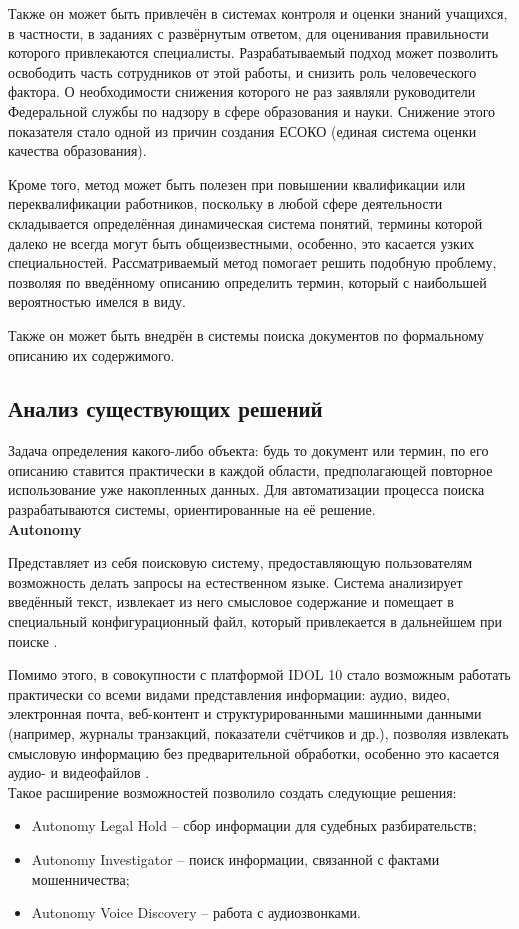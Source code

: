 Также он может быть привлечён в системах контроля и оценки знаний учащихся, в частности, в заданиях с развёрнутым ответом, для оценивания правильности которого привлекаются специалисты. Разрабатываемый подход может позволить освободить часть сотрудников от этой работы, и снизить роль человеческого фактора. О необходимости снижения которого не раз заявляли руководители Федеральной службы по надзору в сфере образования и науки. Снижение этого показателя стало одной из причин создания ЕСОКО (единая система оценки качества образования).

Кроме того, метод может быть полезен при повышении квалификации или переквалификации работников, поскольку в любой сфере деятельности \, складывается определённая динамическая система понятий, термины которой далеко не всегда могут быть общеизвестными, особенно, это касается узких специальностей. Рассматриваемый метод помогает решить подобную проблему, позволяя по введённому описанию определить термин, который с наибольшей вероятностью имелся в виду.

Также он может быть внедрён в системы поиска документов по формальному описанию их содержимого. \newline

\subsection{Анализ существующих решений}
Задача определения какого-либо объекта: будь то документ или термин, по его описанию ставится практически в каждой области, предполагающей повторное использование уже накопленных данных. Для автоматизации процесса поиска разрабатываются системы, ориентированные на её решение. \\

\textbf{Autonomy}

Представляет из себя поисковую систему, предоставляющую пользователям возможность делать запросы на естественном языке. Система анализирует введённый текст, извлекает из него смысловое содержание и помещает в специальный конфигурационный файл, который привлекается в дальнейшем при поиске \cite{isystem}.

Помимо этого, в совокупности с платформой IDOL 10 стало возможным работать практически со всеми видами представления информации: аудио, видео, электронная почта, веб-контент и структурированными машинными данными (например, журналы транзакций, показатели счётчиков и др.), позволяя извлекать смысловую информацию без предварительной обработки, особенно это касается аудио- и видеофайлов \cite{autonomy_cite,autonomy}.\\
%
Такое расширение возможностей позволило создать следующие решения:
%
\begin{itemize}
	\item Autonomy Legal Hold -- сбор информации для судебных разбирательств;
	
	\item Autonomy Investigator -- поиск информации, связанной с фактами мошенничества;
	
	\item Autonomy Voice Discovery -- работа с аудиозвонками. \\
\end{itemize}

